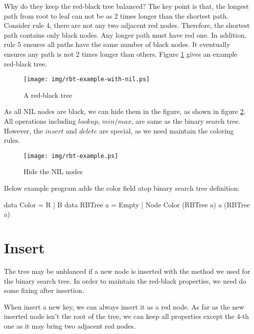 \documentclass[b5paper]{article}
\begin{document}
Why do they keep the red-black tree balanced? The key point is that, the longest path from root to leaf can not be as 2 times longer than the shortest path. Consider rule 4, there are not any two adjacent red nodes. Therefore, the shortest path contains only black nodes. Any longer path must have red one. In addition, rule 5 ensures all paths have the same number of black nodes. It eventually ensures any path is not 2 times longer than others\cite{wiki-rbt}. Figure \ref{fig:rbt-example-with-nil} gives an example red-black tree.

\begin{figure}[htbp]
  \centering
  \texttt{[image: img/rbt-example-with-nil.ps]}
  \caption{A red-black tree}
  \label{fig:rbt-example-with-nil}
\end{figure}

As all NIL nodes are black, we can hide them in the figure, as shown in figure \ref{fig:rbt-example}. All operations including $lookup$, $min/max$, are same as the binary search tree. However, the $insert$ and $delete$ are special, as we need maintain the coloring rules.

\begin{figure}[htbp]
  \centering
  \texttt{[image: img/rbt-example.ps]}
  \caption{Hide the NIL nodes}
  \label{fig:rbt-example}
\end{figure}

Below example program adds the color field atop binary search tree definition:

\begin{Haskell}
data Color = R | B
data RBTree a = Empty
              | Node Color (RBTree a) a (RBTree a)
\end{Haskell}

\begin{Exercise}
\end{Exercise}

\section{Insert}

The tree may be unblanced if a new node is inserted with the method we
used for the binary search tree. In order to maintain the red-black properties,
we need do some fixing after insertion.

When insert a new key, we can always insert it as a
red node. As far as the new inserted node isn't the root of the tree,
we can keep all properties except the 4-th one as it may bring two
adjacent red nodes.
\end{document}

